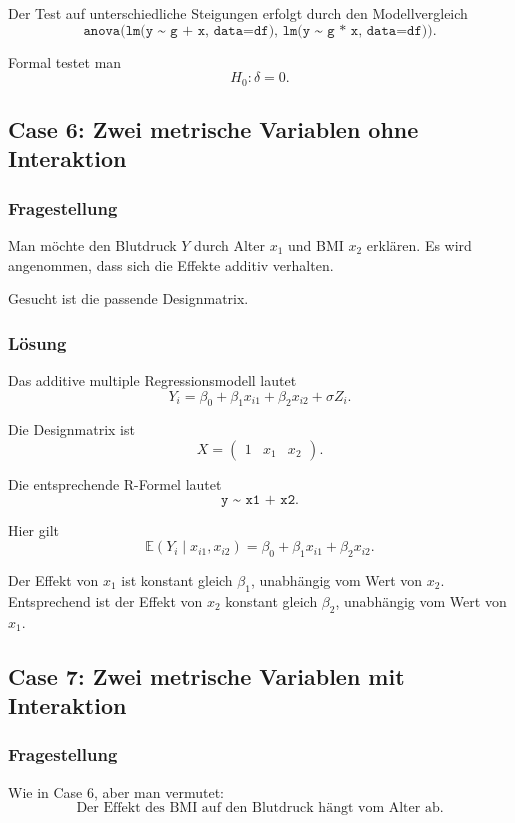 \documentclass[10pt, letterpaper]{article}
\begin{document}
Der Test auf unterschiedliche Steigungen erfolgt durch den Modellvergleich
\[
\texttt{anova(lm(y \textasciitilde{} g + x, data=df), lm(y \textasciitilde{} g * x, data=df))}.
\]

Formal testet man
\[
H_0:\delta=0.
\]

\subsection{Case 6: Zwei metrische Variablen ohne Interaktion}

\subsubsection*{Fragestellung}

Man möchte den Blutdruck \(Y\) durch Alter \(x_1\) und BMI \(x_2\) erklären. Es wird angenommen, dass sich die Effekte additiv verhalten.

Gesucht ist die passende Designmatrix.

\subsubsection*{Lösung}

Das additive multiple Regressionsmodell lautet
\[
Y_i=\beta_0+\beta_1x_{i1}+\beta_2x_{i2}+\sigma Z_i.
\]

Die Designmatrix ist
\[
X=
\begin{pmatrix}
1 & x_1 & x_2
\end{pmatrix}.
\]

Die entsprechende R-Formel lautet
\[
\texttt{y \textasciitilde{} x1 + x2}.
\]

Hier gilt
\[
\mathbb E(Y_i\mid x_{i1},x_{i2})
=
\beta_0+\beta_1x_{i1}+\beta_2x_{i2}.
\]

Der Effekt von \(x_1\) ist konstant gleich \(\beta_1\), unabhängig vom Wert von \(x_2\). Entsprechend ist der Effekt von \(x_2\) konstant gleich \(\beta_2\), unabhängig vom Wert von \(x_1\).

\subsection{Case 7: Zwei metrische Variablen mit Interaktion}

\subsubsection*{Fragestellung}

Wie in Case 6, aber man vermutet:
\[
\text{Der Effekt des BMI auf den Blutdruck hängt vom Alter ab.}
\]
\end{document}

